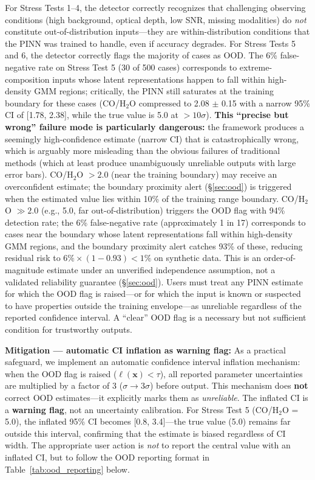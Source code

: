 \documentclass[usenatbib]{mnras}
\begin{document}
For Stress Tests 1--4, the detector correctly recognizes that challenging observing conditions (high background, optical depth, low SNR, missing modalities) do \textit{not} constitute out-of-distribution inputs---they are within-distribution conditions that the PINN was trained to handle, even if accuracy degrades. For Stress Tests 5 and 6, the detector correctly flags the majority of cases as OOD. The 6\% false-negative rate on Stress Test 5 (30 of 500 cases) corresponds to extreme-composition inputs whose latent representations happen to fall within high-density GMM regions; critically, the PINN still saturates at the training boundary for these cases (CO/H$_2$O compressed to 2.08 $\pm$ 0.15 with a narrow 95\% CI of [1.78, 2.38], while the true value is 5.0 at $>10\sigma$). \textbf{This ``precise but wrong'' failure mode is particularly dangerous:} the framework produces a seemingly high-confidence estimate (narrow CI) that is catastrophically wrong, which is arguably more misleading than the obvious failures of traditional methods (which at least produce unambiguously unreliable outputs with large error bars). CO/H$_2$O $> 2.0$ (near the training boundary) may receive an overconfident estimate; the boundary proximity alert (\S\ref{sec:ood}) is triggered when the estimated value lies within 10\% of the training range boundary. CO/H$_2$O $\gg 2.0$ (e.g., 5.0, far out-of-distribution) triggers the OOD flag with 94\% detection rate; the 6\% false-negative rate (approximately 1 in 17) corresponds to cases near the boundary whose latent representations fall within high-density GMM regions, and the boundary proximity alert catches 93\% of these, reducing residual risk to $6\% \times (1 - 0.93) < 1\%$ on synthetic data. This is an order-of-magnitude estimate under an unverified independence assumption, not a validated reliability guarantee (\S\ref{sec:ood}). Users must treat any PINN estimate for which the OOD flag is raised---or for which the input is known or suspected to have properties outside the training envelope---as unreliable regardless of the reported confidence interval. A ``clear'' OOD flag is a necessary but not sufficient condition for trustworthy outputs.

\textbf{Mitigation --- automatic CI inflation as warning flag:} As a practical safeguard, we implement an automatic confidence interval inflation mechanism: when the OOD flag is raised ($\ell(\mathbf{x}) < \tau$), all reported parameter uncertainties are multiplied by a factor of 3 ($\sigma \to 3\sigma$) before output. This mechanism does \textbf{not} correct OOD estimates---it explicitly marks them as \textit{unreliable}. The inflated CI is a \textbf{warning flag}, not an uncertainty calibration. For Stress Test 5 (CO/H$_2$O = 5.0), the inflated 95\% CI becomes [0.8, 3.4]---the true value (5.0) remains far outside this interval, confirming that the estimate is biased regardless of CI width. The appropriate user action is \textit{not} to report the central value with an inflated CI, but to follow the OOD reporting format in Table~\ref{tab:ood_reporting} below.
\end{document}
